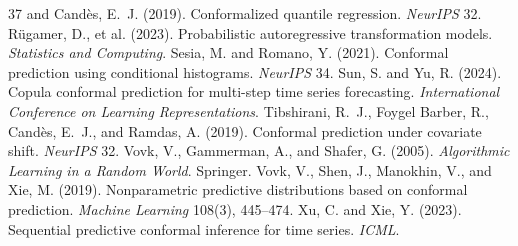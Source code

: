 \documentclass[11pt]{article}
\theoremstyle{remark}
\begin{document}
\begin{thebibliography}{37}
  and Cand\`es, E.~J. (2019). Conformalized quantile regression. \emph{NeurIPS} 32.
 R\"ugamer, D., et al. (2023).
  Probabilistic autoregressive transformation models. \emph{Statistics and
  Computing}.
 Sesia, M. and Romano, Y. (2021).
  Conformal prediction using conditional histograms. \emph{NeurIPS} 34.
 Sun, S. and Yu, R. (2024). Copula
  conformal prediction for multi-step time series forecasting. \emph{International
  Conference on Learning Representations}.
 Tibshirani, R.~J.,
  Foygel Barber, R., Cand\`es, E.~J., and Ramdas, A. (2019). Conformal
  prediction under covariate shift. \emph{NeurIPS} 32.
 Vovk, V., Gammerman, A., and
  Shafer, G. (2005). \emph{Algorithmic Learning in a Random World}. Springer.
 Vovk, V., Shen, J., Manokhin, V.,
  and Xie, M. (2019). Nonparametric predictive distributions based on conformal
  prediction. \emph{Machine Learning} 108(3), 445--474.
 Xu, C. and Xie, Y. (2023). Sequential
  predictive conformal inference for time series. \emph{ICML}.
\end{thebibliography}
\end{document}
